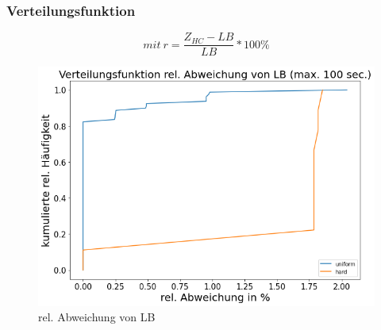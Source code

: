 \documentclass{beamer}
\begin{document}
\begin{frame}

\frametitle{Verteilungsfunktion}

\begin{footnotesize}
\begin{equation}
mit \ r = \frac{Z_{HC}-LB}{LB} * 100\%
\end{equation}
\end{footnotesize}

\begin{figure}[!htbp]
\begin{center}
\includegraphics[scale=0.3]{img/dist2.png}
\end{center}
\caption{rel. Abweichung von LB}
\label{fig:architecture}
\end{figure}



\end{frame}
\end{document}
